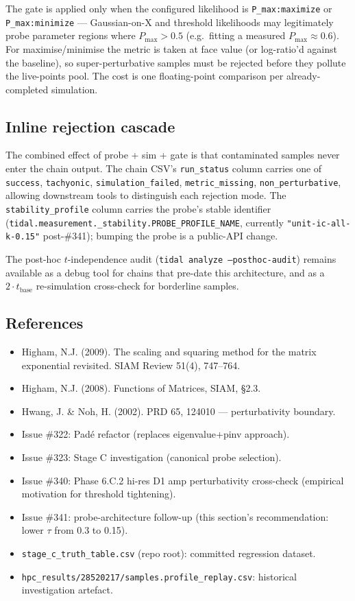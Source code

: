 The gate is applied only when the configured likelihood is
\texttt{P\_max:maximize} or \texttt{P\_max:minimize} — Gaussian-on-X
and threshold likelihoods may legitimately probe parameter regions
where $P_{\max} > 0.5$ (e.g.\ fitting a measured $P_{\max} \approx
0.6$). For maximise/minimise the metric is taken at face value (or
log-ratio'd against the baseline), so super-perturbative samples must
be rejected before they pollute the live-points pool. The cost is
one floating-point comparison per already-completed simulation.

\subsection{Inline rejection cascade}

The combined effect of probe + sim + gate is that contaminated
samples never enter the chain output. The chain CSV's
\texttt{run\_status} column carries one of
\texttt{success}, \texttt{tachyonic}, \texttt{simulation\_failed},
\texttt{metric\_missing}, \texttt{non\_perturbative}, allowing
downstream tools to distinguish each rejection mode. The
\texttt{stability\_profile} column carries the probe's stable
identifier
(\texttt{tidal.measurement.\_stability.PROBE\_PROFILE\_NAME},
currently \texttt{"unit-ic-all-k-0.15"} post-\#341); bumping the probe is a
public-API change.

The post-hoc $t$-independence audit
(\texttt{tidal analyze --posthoc-audit}) remains available as a debug
tool for chains that pre-date this architecture, and as a
$2 \cdot t_{\text{base}}$ re-simulation cross-check for borderline
samples.

\subsection{References}

\begin{itemize}
\item Higham, N.J. (2009). The scaling and squaring method for the
matrix exponential revisited. SIAM Review 51(4), 747--764.
\item Higham, N.J. (2008). Functions of Matrices, SIAM, \S 2.3.
\item Hwang, J. \& Noh, H. (2002). PRD 65, 124010 — perturbativity
boundary.
\item Issue \#322: Pad\'e refactor (replaces eigenvalue+pinv approach).
\item Issue \#323: Stage C investigation (canonical probe selection).
\item Issue \#340: Phase 6.C.2 hi-res D1 amp perturbativity cross-check
(empirical motivation for threshold tightening).
\item Issue \#341: probe-architecture follow-up (this section's
recommendation: lower $\tau$ from 0.3 to 0.15).
\item \texttt{stage\_c\_truth\_table.csv} (repo root): committed
regression dataset.
\item \texttt{hpc\_results/28520217/samples.profile\_replay.csv}:
historical investigation artefact.
\end{itemize}
